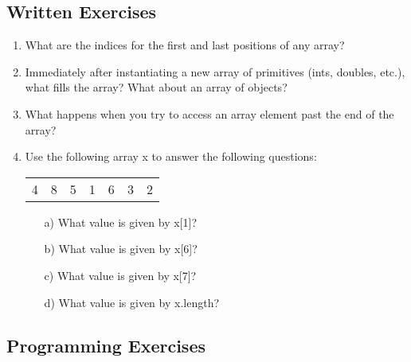 \subsection{Written Exercises}

\setcounter{counter}{1}
\begin{enumerate}[label={\arabic{counter}\addtocounter{counter}{1}}.]

\item What are the indices for the first and last positions of any array?

\item Immediately after instantiating a new array of primitives (ints, doubles, etc.), what fills the array? What about an array of objects?

\item What happens when you try to access an array element past the end of the array?

\item Use the following array x to answer the following questions:
\begin{table}[h]
\begin{tabular}{lllllll}
4 & 8 & 5 & 1 & 6 & 3 & 2
\end{tabular}
\end{table}
\begin{enumerate}
\item[a)]What value is given by x[1]?
\item[b)]What value is given by x[6]?
\item[c)]What value is given by x[7]?
\item[d)]What value is given by x.length?
\end{enumerate}

\end{enumerate}

\subsection{Programming Exercises}

